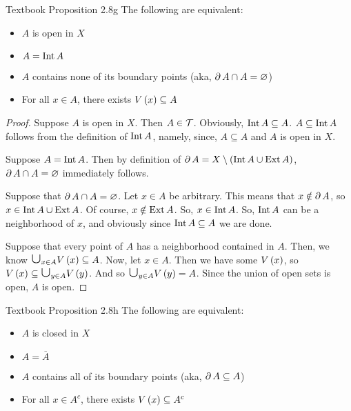 \documentclass{article}
\begin{document}
\begin{proposition}{Textbook Proposition 2.8g}
\label{book:prop:2.8g}
    The following are equivalent:
    \begin{itemize}
        \item $A$ is open in $X$
        \item $A = \textnormal{Int} \, A$
        \item $A$ contains none of its boundary points (aka, $\partial \, A \cap A = \varnothing$)
        \item For all $x \in A$, there exists $V\left(x\right) \subseteq A$
    \end{itemize}
\end{proposition}

\begin{proof}
    Suppose $A$ is open in $X$. Then $A \in \mathcal{T}$. Obviously, $\textnormal{Int} \, A \subseteq A$.
    $A \subseteq \textnormal{Int} \, A$ follows from the definition of $\textnormal{Int} \, A$, namely, since,
    $A \subseteq A$ and $A$ is open in $X$.

    Suppose $A = \textnormal{Int} \, A$.
    Then by definition of $\partial \, A = X \setminus \left(\textnormal{Int} \, A \cup \textnormal{Ext} \, A\right)$,
    $\partial \, A \cap A = \varnothing$ immediately follows.

    Suppose that $\partial \, A \cap A = \varnothing$. Let $x \in A$ be arbitrary.
    This means that $x \notin \partial \, A$, so $x \in \textnormal{Int} \, A \cup \textnormal{Ext} \, A$. Of course,
    $x \notin \textnormal{Ext} \, A$. So, $x \in \textnormal{Int} \, A$. So, $\textnormal{Int} \, A$ can be a neighborhood of
    $x$, and obviously since $\textnormal{Int} \, A \subseteq A$ we are done.

    Suppose that every point of $A$ has a neighborhood contained in $A$. Then, we know
    $\medcup_{x \in A} \nbhd{x} \subseteq A$. Now, let $x \in A$. Then we have some $V\left(x\right)$,
    so $\nbhd{x} \subseteq \medcup_{y \in A} \nbhd{y}$. And so $\medcup_{y \in A} \nbhd{y} = A$.
    Since the union of open sets is open, $A$ is open.
\end{proof}

\begin{proposition}{Textbook Proposition 2.8h}
\label{book:prop:2.8h}
     The following are equivalent:
    \begin{itemize}
        \item $A$ is closed in $X$
        \item $A = \overline{A}$
        \item $A$ contains all of its boundary points (aka, $\partial \, A \subseteq A$)
        \item For all $x \in A^c$, there exists $V\left(x\right) \subseteq A^c$
    \end{itemize}
\end{proposition}
\end{document}
